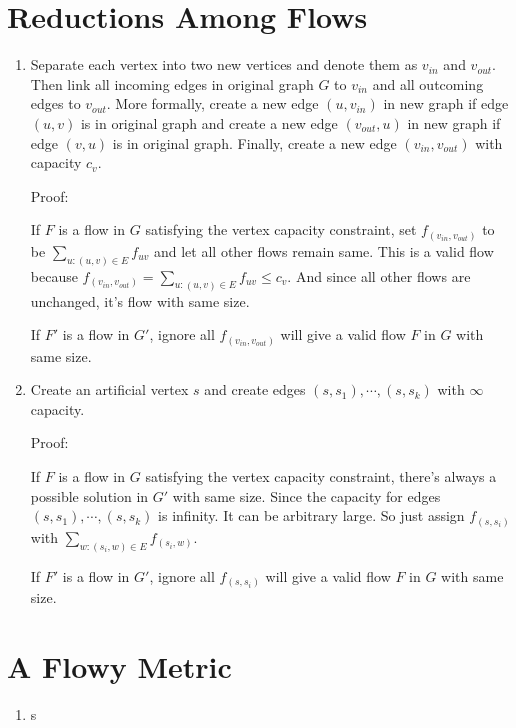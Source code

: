 \documentclass[11pt]{article}
\newenvironment{qparts}{\begin{enumerate}[{(}a{)}]}{\end{enumerate}}
\begin{document}
\section{Reductions Among Flows}
\begin{qparts}
	
	\item 

	Separate each vertex into two new vertices and denote them as $v_{in}$ and $v_{out}$. Then link all incoming edges in original graph $G$ to $v_{in}$ and all outcoming edges to $v_{out}$. More formally, create a new edge $(u, v_{in})$ in new graph if edge $(u, v)$ is in original graph and create a new edge $(v_{out}, u)$ in new graph if edge $(v, u)$ is in original graph. Finally, create a new edge $(v_{in}, v_{out})$ with capacity $c_v$.
	
	Proof:
	
	If $F$ is a flow in $G$ satisfying the vertex capacity constraint, set $f_{(v_{in}, v_{out})}$ to be $\sum_{u:(u, v)\in E} f_{uv}$ and let all other flows remain same. This is a valid flow because $f_{(v_{in}, v_{out})} = \sum_{u:(u, v)\in E} f_{uv} \le c_v$. And since all other flows are unchanged, it's flow with same size.
	
	If $F\prime$ is a flow in $G\prime$, ignore all $f_{(v_{in}, v_{out})}$ will give a valid flow $F$ in $G$ with same size.

	\item 

	Create an artificial vertex $s$ and create edges $(s, s_1), \cdots, (s, s_k)$ with $\infty$ capacity.
	
	Proof:
	
	If $F$ is a flow in $G$ satisfying the vertex capacity constraint, there's always a possible solution in $G\prime$ with same size. Since the capacity for edges $(s, s_1), \cdots, (s, s_k)$ is infinity. It can be arbitrary large. So just assign $f_{(s, s_i)}$ with $\sum_{w:(s_i, w) \in E}f_{(s_i, w)}$.
	
	If $F\prime$ is a flow in $G\prime$, ignore all $f_{(s, s_i)}$ will give a valid flow $F$ in $G$ with same size.	
		
\end{qparts}
\newpage
\section{A Flowy Metric}
\begin{qparts}
	
	\item 

	s
		
\end{qparts}
\end{document}
